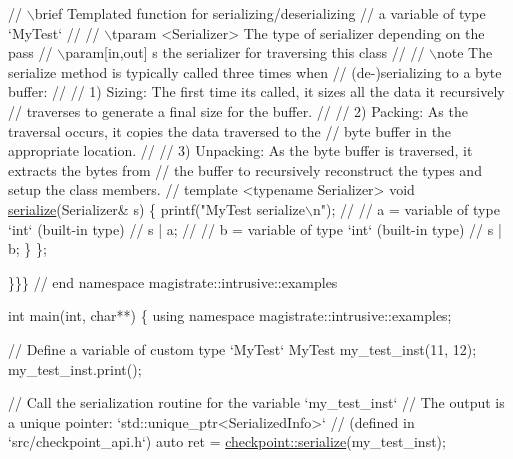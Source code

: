 \begin{DoxyCodeInclude}
{  \textcolor{comment}{// \(\backslash\)brief Templated function for serializing/deserializing}
  \textcolor{comment}{// a variable of type `MyTest`}
  \textcolor{comment}{//}
  \textcolor{comment}{// \(\backslash\)tparam <Serializer> The type of serializer depending on the pass}
  \textcolor{comment}{// \(\backslash\)param[in,out] s the serializer for traversing this class}
  \textcolor{comment}{//}
  \textcolor{comment}{// \(\backslash\)note The serialize method is typically called three times when}
  \textcolor{comment}{// (de-)serializing to a byte buffer:}
  \textcolor{comment}{//}
  \textcolor{comment}{// 1) Sizing: The first time its called, it sizes all the data it recursively}
  \textcolor{comment}{// traverses to generate a final size for the buffer.}
  \textcolor{comment}{//}
  \textcolor{comment}{// 2) Packing: As the traversal occurs, it copies the data traversed to the}
  \textcolor{comment}{// byte buffer in the appropriate location.}
  \textcolor{comment}{//}
  \textcolor{comment}{// 3) Unpacking: As the byte buffer is traversed, it extracts the bytes from}
  \textcolor{comment}{// the buffer to recursively reconstruct the types and setup the class members.}
  \textcolor{comment}{//}
  \textcolor{keyword}{template} <\textcolor{keyword}{typename} Serializer>
  \textcolor{keywordtype}{void} \hyperlink{namespacecheckpoint_a075da4e7344cf037943362517e606c3a}{serialize}(Serializer& s) \{
    printf(\textcolor{stringliteral}{"MyTest serialize\(\backslash\)n"});
    \textcolor{comment}{//}
    \textcolor{comment}{// a = variable of type `int` (built-in type)}
    \textcolor{comment}{//}
    s | a;
    \textcolor{comment}{//}
    \textcolor{comment}{// b = variable of type `int` (built-in type)}
    \textcolor{comment}{//}
    s | b;
  \}
\};

\}\}\} \textcolor{comment}{// end namespace magistrate::intrusive::examples}

\textcolor{keywordtype}{int} main(\textcolor{keywordtype}{int}, \textcolor{keywordtype}{char}**) \{
  \textcolor{keyword}{using namespace }magistrate::intrusive::examples;

  \textcolor{comment}{// Define a variable of custom type `MyTest`}
  MyTest my\_test\_inst(11, 12);
  my\_test\_inst.print();

  \textcolor{comment}{// Call the serialization routine for the variable `my\_test\_inst`}
  \textcolor{comment}{// The output is a unique pointer: `std::unique\_ptr<SerializedInfo>`}
  \textcolor{comment}{// (defined in `src/checkpoint\_api.h`)}
  \textcolor{keyword}{auto} ret = \hyperlink{namespacecheckpoint_a075da4e7344cf037943362517e606c3a}{checkpoint::serialize}(my\_test\_inst);

}
\end{DoxyCodeInclude}

